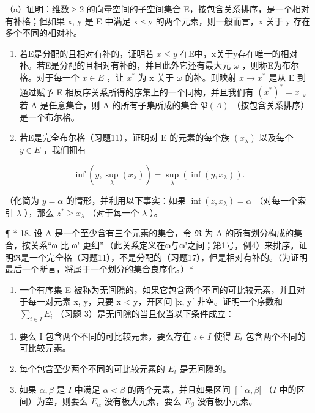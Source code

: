 （a）证明：维数 ≥ 2 的向量空间的子空间集合 E，按包含关系排序，是一个相对有补格；但如果 x, y 是 E 中满足 x ≤ y 的两个元素，则一般而言，x 关于 y 存在多个不同的相对补。

\begin{enumerate}
\def\labelenumi{(\alph{enumi})}
\setcounter{enumi}{1}
\item
  若E是分配的且相对有补的，证明若 \(x \leqslant y\) 在E中，x关于y存在唯一的相对补。若E是分配的且相对有补的，并且此外它还有最大元 \(\omega\) ，则称E为布尔格。对于每一个 \(x \in E\) ，让 \(x^{*}\) 为 x 关于 \(\omega\) 的补。则映射 \(x \to x^{*}\) 是从 E 到通过赋予 E 相反序关系所得的序集上的一个同构，并且我们有 \((x^{*})^{*} = x\) 。若 A 是任意集合，则 A 的所有子集所成的集合 \(\mathfrak{P}(A)\) （按包含关系排序）是一个布尔格。
\item
  若E是完全布尔格（习题11），证明对 E 的元素的每个族 \((x_{\lambda})\) 以及每个 \(y \in E\) ，我们拥有
\end{enumerate}

\[
\inf (y, \sup _ {\lambda} (x _ {\lambda})) = \sup _ {\lambda} (\inf (y, x _ {\lambda})).
\]

（化简为 \(y = \alpha\) 的情形，并利用以下事实：如果 \(\inf (z, x_{\lambda}) = \alpha\) （对每一个索引 \(\lambda\) ），那么 \(z^{*} \geqslant x_{\lambda}\) （对于每一个 \(\lambda\) ）。

¶ * 18. 设 A 是一个至少含有三个元素的集合，令 ℜ 为 A 的所有划分构成的集合，按关系“ω 比 ω' 更细”\,（此关系定义在ω与ω'之间；第1号，例4）来排序。证明ℜ是一个完全格（习题11），不是分配的（习题17），但是相对有补的。（为证明最后一个断言，将属于一个划分的集合良序化。）*

\begin{enumerate}
\def\labelenumi{\arabic{enumi}.}
\setcounter{enumi}{18}
\tightlist
\item
  一个有序集 E 被称为无间隙的，如果它包含两个不同的可比较元素，并且对于每一对元素 x, y，只要 x \textless{} y，开区间 {]}x, y{[} 非空。证明一个序数和 \(\sum_{i\in I}E_{i}\) （习题 3）是无间隙的当且仅当以下条件成立：
\end{enumerate}

\begin{enumerate}
\def\labelenumi{(\Roman{enumi})}
\item
  要么 I 包含两个不同的可比较元素，要么存在 \(\iota \in I\) 使得 \(E_{t}\) 包含两个不同的可比较元素。
\item
  每个包含至少两个不同的可比较元素的 \(E_{t}\) 是无间隙的。
\item
  如果 \(\alpha, \beta\) 是 \(I\) 中满足 \(\alpha < \beta\) 的两个元素，并且如果区间 \([]\alpha, \beta[\) （\(I\) 中的区间）为空，则要么 \(E_{\alpha}\) 没有极大元素，要么 \(E_{\beta}\) 没有极小元素。
\end{enumerate}

